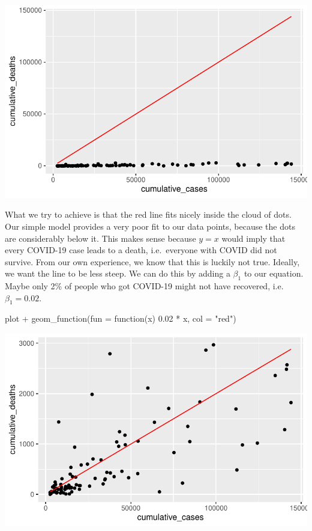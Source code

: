 \documentclass[
  letterpaper,
]{krantz}
\makeatletter
\newenvironment{Shaded}{\begin{snugshade}}{\end{snugshade}}
\newcommand{\AttributeTok}[1]{\textcolor[rgb]{0.40,0.45,0.13}{#1}}
\newcommand{\ControlFlowTok}[1]{\textcolor[rgb]{0.00,0.23,0.31}{#1}}
\newcommand{\FloatTok}[1]{\textcolor[rgb]{0.68,0.00,0.00}{#1}}
\newcommand{\FunctionTok}[1]{\textcolor[rgb]{0.28,0.35,0.67}{#1}}
\newcommand{\NormalTok}[1]{\textcolor[rgb]{0.00,0.23,0.31}{#1}}
\newcommand{\SpecialCharTok}[1]{\textcolor[rgb]{0.37,0.37,0.37}{#1}}
\newcommand{\StringTok}[1]{\textcolor[rgb]{0.13,0.47,0.30}{#1}}
\newenvironment{kframe}{%
\medskip{}
\setlength{\fboxsep}{.8em}
 \def\at@end@of@kframe{}%
 \ifinner\ifhmode%
  \def\at@end@of@kframe{\end{minipage}}%
  \begin{minipage}{\columnwidth}%
 \fi\fi%
 \def\FrameCommand##1{\hskip\@totalleftmargin \hskip-\fboxsep
 \colorbox{shadecolor}{##1}\hskip-\fboxsep
     \hskip-\linewidth \hskip-\@totalleftmargin \hskip\columnwidth}%
 \MakeFramed {\advance\hsize-\width
   \@totalleftmargin\z@ \linewidth\hsize
   \@setminipage}}%
 {\par\unskip\endMakeFramed%
 \at@end@of@kframe}
\renewenvironment{Shaded}{\begin{kframe}}{\end{kframe}}
\makeatother
\begin{document}
\includegraphics{13_regressions_files/figure-pdf/fitting-model-by-hand-step-four-1.pdf}

What we try to achieve is that the red line fits nicely inside the cloud
of dots. Our simple model provides a very poor fit to our data points,
because the dots are considerably below it. This makes sense because
\(y = x\) would imply that every COVID-19 case leads to a death,
i.e.~everyone with COVID did not survive. From our own experience, we
know that this is luckily not true. Ideally, we want the line to be less
steep. We can do this by adding a \(\beta_1\) to our equation. Maybe
only 2\% of people who got COVID-19 might not have recovered,
i.e.~\(\beta_1 = 0.02\).

\begin{Shaded}
\begin{Highlighting}[]
\NormalTok{plot }\SpecialCharTok{+}
  \FunctionTok{geom\_function}\NormalTok{(}\AttributeTok{fun =} \ControlFlowTok{function}\NormalTok{(x) }\FloatTok{0.02} \SpecialCharTok{*}\NormalTok{ x, }\AttributeTok{col =} \StringTok{"red"}\NormalTok{)}
\end{Highlighting}
\end{Shaded}

\includegraphics{13_regressions_files/figure-pdf/fitting-model-by-hand-step-five-1.pdf}
\end{document}
